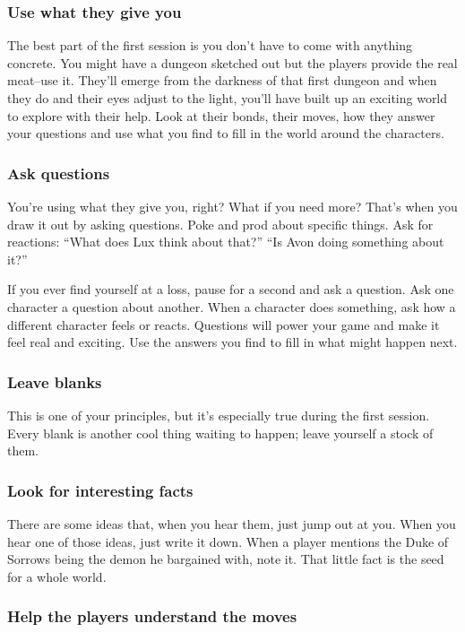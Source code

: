 \subsubsection{Use what they give you}


 The best part of the first session is you don't have to come with anything concrete. You might have a dungeon sketched out but the players provide the real meat--use it. They'll emerge from the darkness of that first dungeon and when they do and their eyes adjust to the light, you'll have built up an exciting world to explore with their help. Look at their bonds, their moves, how they answer your questions and use what you find to fill in the world around the characters.
\subsubsection{Ask questions}


 You're using what they give you, right? What if you need more? That's when you draw it out by asking questions. Poke and prod about specific things. Ask for reactions: ``What does Lux think about that?'' ``Is Avon doing something about it?''


 If you ever find yourself at a loss, pause for a second and ask a question. Ask one character a question about another. When a character does something, ask how a different character feels or reacts. Questions will power your game and make it feel real and exciting. Use the answers you find to fill in what might happen next.
\subsubsection{Leave blanks}


 This is one of your principles, but it's especially true during the first session. Every blank is another cool thing waiting to happen; leave yourself a stock of them.
\subsubsection{Look for interesting facts}


 There are some ideas that, when you hear them, just jump out at you. When you hear one of those ideas, just write it down. When a player mentions the Duke of Sorrows being the demon he bargained with, note it. That little fact is the seed for a whole world.
\subsubsection{Help the players understand the moves}


